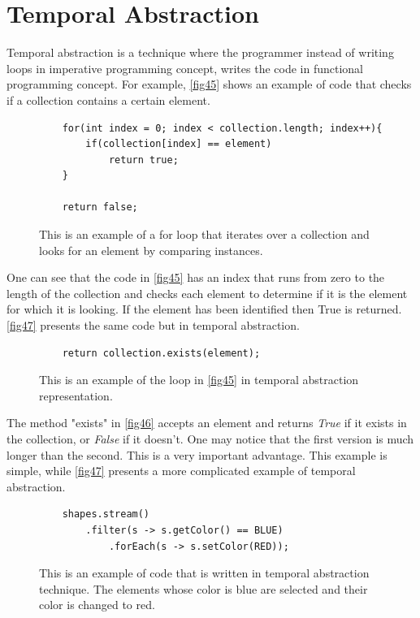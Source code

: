 \section{Temporal Abstraction} \label{sec:Temporal Abstraction}
Temporal abstraction is a technique where the programmer instead of writing loops in imperative programming concept, writes the code in functional programming concept. For example, \autoref{fig45} shows an example of code that checks if a collection contains a certain element.
\begin{figure}[H]
	\begin{lstlisting}
	for(int index = 0; index < collection.length; index++){
		if(collection[index] == element)
			return true;
	}
	
	return false;
	\end{lstlisting}
	\caption{This is an example of a for loop that iterates over a collection and looks for an element by comparing instances.}
	\label{fig45}
\end{figure}
One can see that the code in \autoref{fig45} has an index that runs from zero to the length of the collection and checks each element to determine if it is the element for which it is looking. If the element has been identified then True is returned. \autoref{fig47} presents the same code but in temporal abstraction.
\begin{figure}[H]
	\begin{lstlisting}
	return collection.exists(element);
	\end{lstlisting}
	\caption{This is an example of the loop in \autoref{fig45} in temporal abstraction representation.}
	\label{fig46}
\end{figure}
The method "exists" in \autoref{fig46} accepts an element and returns \textit{True} if it exists in the collection, or \textit{False} if it doesn't. One may notice that the first version is much longer than the second. This is a very important advantage. This example is simple, while \autoref{fig47} presents a more complicated example of temporal abstraction.
\begin{figure}[H]
	\begin{lstlisting}
	shapes.stream()
		.filter(s -> s.getColor() == BLUE)
			.forEach(s -> s.setColor(RED));
	\end{lstlisting}
	\caption{This is an example of code that is written in temporal abstraction technique. The elements whose color is blue are selected and their color is changed to red.}
	\label{fig47}
\end{figure}
